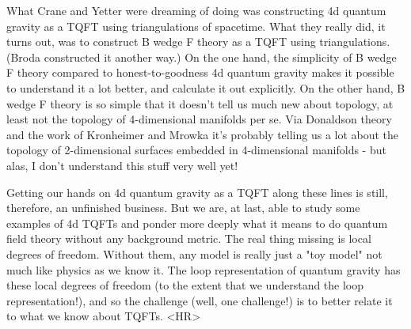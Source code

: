 What Crane and Yetter were dreaming of doing was constructing 4d quantum
gravity as a TQFT using triangulations of spacetime.  What they really
did, it turns out, was to construct B wedge F theory as a TQFT using
triangulations.  (Broda constructed it another way.)  On the one hand, the
simplicity of B wedge F theory compared to honest-to-goodness 4d quantum
gravity makes it possible to understand it a lot better, and calculate
it out explicitly.   On the other hand, B wedge F theory is so simple
that it doesn't tell us much new about topology, at least not the
topology of 4-dimensional manifolds per se.   Via Donaldson theory and
the work of Kronheimer and Mrowka it's probably telling us a lot about
the topology of 2-dimensional surfaces embedded in 4-dimensional
manifolds - but alas, I don't understand this stuff very well yet!

Getting our hands on 4d quantum gravity as a TQFT along these lines is
still, therefore, an unfinished business.  But we are, at last, able to
study some examples of 4d TQFTs and ponder more deeply what it means to
do quantum field theory without any background metric.  The real thing
missing is local degrees of freedom.  Without them, any model is really
just a "toy model" not much like physics as we know it.  The loop
representation of quantum gravity has these local degrees of freedom (to
the extent that we understand the loop representation!), and so the
challenge (well, one challenge!) is to better relate it to what we know
about TQFTs.  
<HR>




